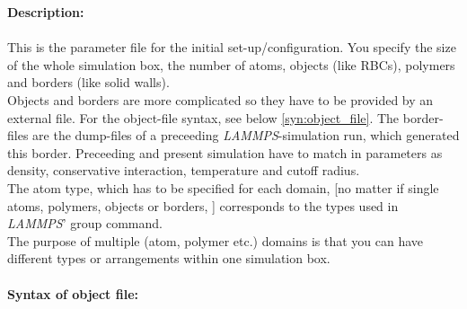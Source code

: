 \documentclass[a4paper,10pt]{scrreprt}
\begin{document}
\textbf{Description:}\\ \\
This is the parameter file for the initial set-up/configuration. You specify the size of the whole simulation box, the number of atoms, objects (like RBCs), polymers and borders (like solid walls).\\Objects and borders are more complicated so they have to be provided by an external file. For the object-file syntax, see below \ref{syn:object_file}. The border-files are the dump-files of a preceeding \textit{LAMMPS}-simulation run, which generated this border. Preceeding and present simulation have to match in parameters as density, conservative interaction, temperature and cutoff radius.\\The atom type, which has to be specified for each domain, [no matter if single atoms, polymers, objects or borders, ] corresponds to the types used in \textit{LAMMPS}' group command.\\The purpose of multiple (atom, polymer etc.) domains is that you can have different types or arrangements within one simulation box. 
\\ \\
\textbf{Syntax of object file:}
\label{syn:object_file}
\end{document}

